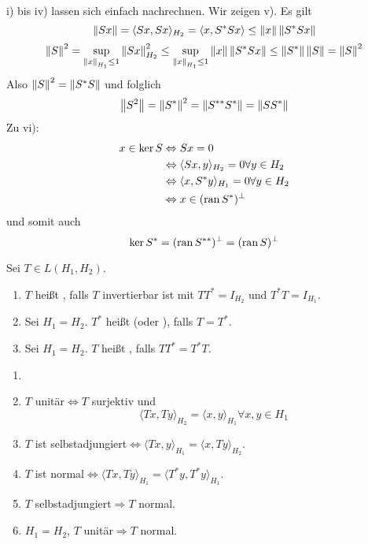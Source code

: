 \begin{beweis}
	i) bis iv) lassen sich einfach  nachrechnen. Wir zeigen v). Es gilt
	\[ \left\|Sx\right\|=\langle Sx,Sx\rangle_{H_2}=\langle x,S^\ast Sx\rangle\leq\left\|x\right\|\left\|S^\ast S x\right\| \]
	\[ \left\|S\right\|^2=\sup_{\left\|x\right\|_{H_1}\leq 1}\left\|Sx\right\|^2_{H_2}\leq\sup_{\left\|x\right\|_{H_1}\leq 1}\left\|x\right\|\left\|S^\ast Sx\right\|\leq\left\|S^\ast\right\|\left\|S\right\|=\left\|S\right\|^2 \]
	Also $ \left\|S\right\|^2=\left\|S^\ast S\right\| $ und folglich
	\[ \left\|S^2\right\|=\left\|S^\ast\right\|^2=\left\|S^{\ast\ast}S^\ast\right\|=\left\|SS^\ast\right\| \]
	Zu vi): 
	\begin{align*}
	x\in\ker S&\Leftrightarrow Sx=0\\
	&\Leftrightarrow\langle Sx,y\rangle_{H_2}=0\forall y\in H_2\\
	&\Leftrightarrow\langle x,S^\ast y\rangle_{H_1}=0\forall y\in H_2\\
	&\Leftrightarrow x\in (\operatorname{ran} S^\ast)^\perp
	\end{align*}
	und somit auch
	\[ \ker S^\ast=(\operatorname{ran} S^{\ast\ast})^\perp=(\operatorname{ran} S)^\perp \]
\end{beweis}
\newpage
\begin{definition}
	Sei $ T\in L(H_1,H_2) $.
	\begin{enumerate}
		\item $ T $ hei\ss t , falls $ T $ invertierbar ist mit $ TT^\ast=I_{H_2} $ und $ T^\ast T=I_{H_1} $.
		\item Sei $ H_1=H_2 $. $ T^\ast $ hei\ss t  (oder ), falls $ T=T^\ast $.
		\item Sei $ H_1=H_2 $. $ T $ hei\ss t , falls $ TT^\ast=T^\ast T $.  
	\end{enumerate}
\end{definition}
\begin{bemerkung*}
	\begin{enumerate}
		\item[]
		\item $ T $ unit\"ar$ \Leftrightarrow T$ surjektiv und
		\[ \langle Tx,Ty\rangle_{H_2}=\langle x,y\rangle_{H_1}\forall x,y\in H_1 \]
		\item $ T $ ist selbstadjungiert$ \Leftrightarrow\langle Tx,y\rangle_{H_1}=\langle x,Ty\rangle_{H_2} $.
		\item $ T $ ist normal$ \Leftrightarrow\langle Tx,Ty\rangle_{H_1}=\langle T^\ast y,T^\ast y\rangle_{H_1} $.
		\item $ T $ selbstadjungiert$ \Rightarrow T $ normal.
		\item $ H_1=H_2 $, $ T $ unit\"ar$ \Rightarrow T $ normal. 
	\end{enumerate}
\end{bemerkung*}

